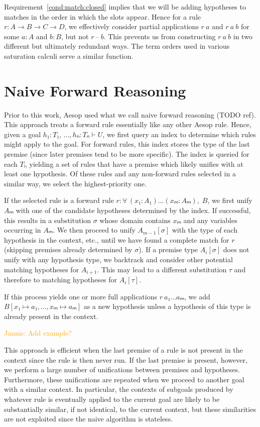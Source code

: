 \documentclass[runningheads]{llncs}
\newcommand{\jcom}[1]{{\textcolor{orange}{Jannis: #1}} }
\newcommand{\All}[2]{\ensuremath{\forall\, #1,\; #2}}
\begin{document}
Requirement~\ref{cond:match:closed} implies that we will be adding hypotheses to matches in the order in which the slots appear.
Hence for a rule $r : A → B → C → D$, we effectively consider partial applications $r~a$ and $r~a~b$ for some $a : A$ and $b : B$, but not $r~\text{--}~b$.
This prevents us from constructing $r~a~b$ in two different but ultimately redundant ways.
The term orders used in various saturation calculi serve a similar function.

\section{Naive Forward Reasoning}

Prior to this work, Aesop used what we call naive forward reasoning (TODO ref).
This approach treats a forward rule essentially like any other Aesop rule.
Hence, given a goal $h₁ : T₁,\, \dots, hₙ : Tₙ ⊢ U$, we first query an index to determine which rules might apply to the goal.
For forward rules, this index stores the type of the last premise (since later premises tend to be more specific).
The index is queried for each $Tᵢ$, yielding a set of rules that have a premise which likely unifies with at least one hypothesis.
Of these rules and any non-forward rules selected in a similar way, we select the highest-priority one.

If the selected rule is a forward rule $r : \All{(x₁ : A₁) \dots (xₘ : Aₘ)}{B}$, we first unify $Aₘ$ with one of the candidate hypotheses determined by the index.
If successful, this results in a substitution $σ$ whose domain contains $xₘ$ and any variables occurring in $Aₘ$.
We then proceed to unify $A_{m-1}[σ]$ with the type of each hypothesis in the context, etc., until we have found a complete match for $r$ (skipping premises already determined by $σ$).
If a premise type $A_{i}[σ]$ does not unify with any hypothesis type, we backtrack and consider other potential matching hypotheses for $A_{i+1}$.
This may lead to a different substitution $τ$ and therefore to matching hypotheses for $A_{i}[τ]$.

If this process yields one or more full applications $r~a₁ \dots aₘ$, we add $B[x₁ ↦ a₁, \dots, xₘ ↦ aₘ]$ as a new hypothesis unless a hypothesis of this type is already present in the context.

\jcom{Add example?}

This approach is efficient when the last premise of a rule is not present in the context since the rule is then never run.
If the last premise is present, however, we perform a large number of unifications between premises and hypotheses.
Furthermore, these unifications are repeated when we proceed to another goal with a similar context.
In particular, the contexts of subgoals produced by whatever rule is eventually applied to the current goal are likely to be substantially similar, if not identical, to the current context, but these similarities are not exploited since the naive algorithm is stateless.
\end{document}
